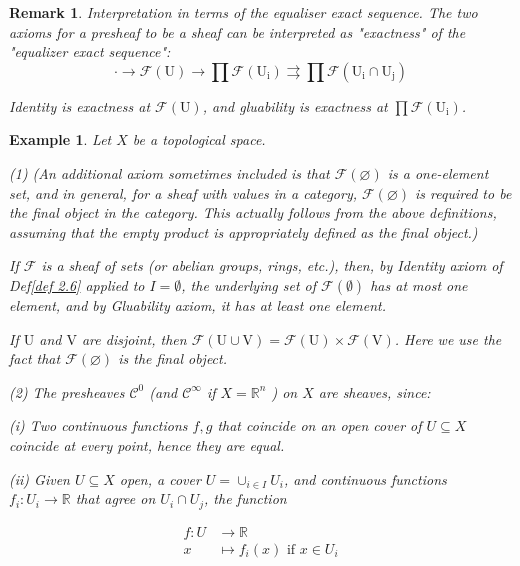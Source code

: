 \documentclass{article}
\newtheorem{example}[theorem]{Example}
\newtheorem{remark}[theorem]{Remark}
\begin{document}
\begin{remark}
    Interpretation in terms of the equaliser exact sequence. The two axioms for a presheaf to be a sheaf can be interpreted as "exactness" of the "equalizer exact sequence": $$\cdot\longrightarrow \mathcal{F}(\mathrm{U}) \longrightarrow \prod \mathcal{F}\left(\mathrm{U}_{\mathrm{i}}\right) \rightrightarrows \prod \mathcal{F}\left(\mathrm{U}_{\mathrm{i}} \cap \mathrm{U}_{\mathrm{j}}\right)$$
    
    Identity is exactness at $\mathcal{F}(\mathrm{U})$, and gluability is exactness at $\prod \mathcal{F}\left(\mathrm{U}_{\mathrm{i}}\right)$.
\end{remark}
\begin{example}
Let $X$ be a topological space.

(1) 
(An additional axiom sometimes included is that $\mathcal{F}(\varnothing)$ is a one-element set, and in general, for a sheaf with values in a category, $\mathcal{F}(\varnothing)$ is required to be the final object in the category. This actually follows from the above definitions, assuming that the empty product is appropriately defined as the final object.)

If $\mathcal{F}$ is a sheaf of sets (or abelian groups, rings, etc.), then, by Identity axiom of Def\ref{def 2.6} applied to $I=\emptyset$, the underlying set of $\mathcal{F}(\emptyset)$ has at most one element, and by Gluability axiom, it has at least one element.

If $\mathrm{U}$ and $\mathrm{V}$ are disjoint, then $\mathcal{F}(\mathrm{U} \cup \mathrm{V})=\mathcal{F}(\mathrm{U}) \times \mathcal{F}(\mathrm{V})$. Here we use the fact that $\mathcal{F}(\varnothing)$ is the final object.

(2) The presheaves $\mathcal{C}^{0}$ (and $\mathcal{C}^{\infty}$ if $X=\mathbb{R}^{n}$ ) on $X$ are sheaves, since:

(i) Two continuous functions $f, g$ that coincide on an open cover of $U \subseteq X$ coincide at every point, hence they are equal.

(ii) Given $U \subseteq X$ open, a cover $U=\cup_{i \in I} U_{i}$, and continuous functions $f_{i}: U_{i} \rightarrow \mathbb{R}$ that agree on $U_{i} \cap U_{j}$, the function

$$
\begin{aligned}
f: U & \rightarrow \mathbb{R} \\
x & \mapsto f_{i}(x) \text { if } x \in U_{i}
\end{aligned}
$$


\end{example}
\end{document}
